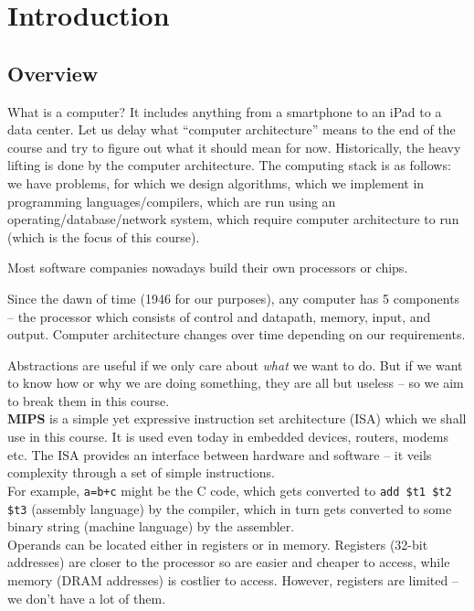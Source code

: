 \documentclass{article}
\begin{document}
\thispagestyle{empty}
\titleBC

\tableofcontents
\clearpage


\section{Introduction}

	\subsection{Overview}

		What is a computer? It includes anything from a smartphone to an iPad to a data center. Let us delay what ``computer architecture'' means to the end of the course and try to figure out what it should mean for now. Historically, the heavy lifting is done by the computer architecture. The computing stack is as follows: we have problems, for which we design algorithms, which we implement in programming languages/compilers, which are run using an operating/database/network system, which require computer architecture to run (which is the focus of this course).

		Most software companies nowadays build their own processors or chips.

		Since the dawn of time (1946 for our purposes), any computer has 5 components -- the processor which consists of control and datapath, memory, input, and output. Computer architecture changes over time depending on our requirements.

		Abstractions are useful if we only care about \emph{what} we want to do. But if we want to know how or why we are doing something, they are all but useless -- so we aim to break them in this course.\\

		\textbf{MIPS} is a simple yet expressive instruction set architecture (ISA) which we shall use in this course. It is used even today in embedded devices, routers, modems etc. The ISA provides an interface between hardware and software -- it veils complexity through a set of simple instructions.\\
		For example, \texttt{a=b+c} might be the C code, which gets converted to \texttt{add \$t1 \$t2 \$t3} (assembly language) by the compiler, which in turn gets converted to some binary string (machine language) by the assembler.\\
		Operands can be located either in registers or in memory. Registers (32-bit addresses) are closer to the processor so are easier and cheaper to access, while memory (DRAM addresses) is costlier to access. However, registers are limited -- we don't have a lot of them.
\end{document}
